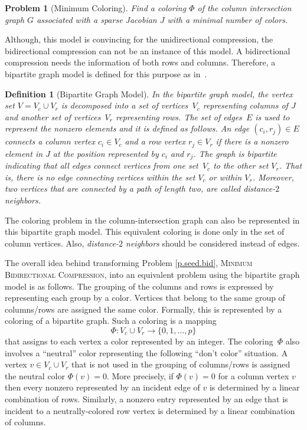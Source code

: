 \documentclass[12pt, twoside,a4paper,toc=bibliography]{scrbook}
\newtheorem{problem}{Problem}
\newtheorem{definition}{Definition}
\newcommand{\MinBidCom}{\textsc{Minimum Bidirectional Compression}}
\begin{document}
\begin{problem}[Minimum Coloring]
\label{p:mincol}
Find a coloring $\Phi$ of the column intersection graph $G$
associated with a sparse Jacobian $J$
with a minimal number of colors.
\end{problem}

Although, this model is convincing for the unidirectional compression,
the bidirectional compression can not be an instance of this model.
A bidirectional compression needs the information of both rows and columns. Therefore, a bipartite graph model is defined for this purpose as in~\cite{Coleman1996SaE,cv:ecs,hs:csj}.

\begin{definition}[Bipartite Graph Model]
\label{d.bip.graph}
In the bipartite graph model, the vertex set $V=V_c\cup V_r$
is decomposed into a set of vertices~$V_c$ representing columns of $J$ and another set of
vertices~$V_r$ representing rows. The set of edges~$E$ is used to represent the nonzero
elements and it is defined as follows. An edge $(c_i , r_j) \in E$ connects a column
vertex $c_i \in V_c$ and a row vertex $r_j \in V_r$ if there is a nonzero element in $J$
at the position represented by $c_i$ and $r_j$. The graph is bipartite indicating that
all edges connect vertices from one set~$V_c$ to the other set $V_r$. That is, there is
no edge connecting vertices within the set $V_c$ or within $V_r$. Moreover, two vertices
that are connected by a path of length two, are called \emph{distance-$2$ neighbors}.
\end{definition}

The coloring problem in the column-intersection graph can also be represented in
this bipartite graph model. This equivalent coloring is done only in the set of
column vertices. Also, \emph{distance-$2$ neighbors} should be considered instead of
edges.

The overall idea behind transforming Problem \ref{p.seed.bid}, \MinBidCom, into an equivalent
problem using the bipartite graph model is as follows. The grouping of the columns and
rows is expressed by representing each group by a color. Vertices that belong to the same
group of columns/rows are assigned the same color. Formally, this is represented by a
coloring of a bipartite graph. Such a coloring is a mapping
$$
\Phi:V_c \cup V_r \to \{0,1,\dots ,p\}
$$
that assigns to each vertex a color represented by an integer.
The coloring~$\Phi$ also involves a ``neutral'' color
representing the following ``don't color'' situation. A vertex $v \in V_c \cup V_r$ that is not
used in the grouping of columns/rows is assigned the neutral color $\Phi(v)=0$. More
precisely, if $\Phi(v)=0$ for a column vertex $v$ then every nonzero represented by an
incident edge of $v$ is determined by a linear combination of rows. Similarly, a nonzero
entry represented by an edge that is incident to a neutrally-colored row vertex is
determined by a linear combination of columns.
\end{document}
